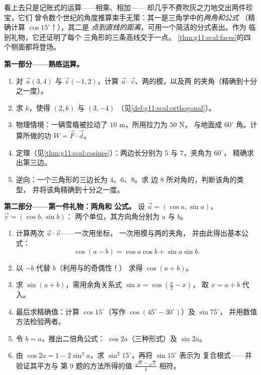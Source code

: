 \begin{problem}
\label{pb:g11:scal:1}
看上去只是记账式的运算——相乘、相加——
却几乎不费吹灰之力地交出两件珍宝，它们
曾令数个世纪的角度推算束手无策：其一是三角学中的\emph{两角和公式}
（精确计算 $\cos 15^\circ$！），其二是
\emph{点到直线的距离}，可用一个简洁的分式表出。作为
临别礼物，它还证明了每个
三角形的三条高线交于一点。
\cref{thm:g11:scal:faces}的四个侧面都将登场。

\medskip
\noindent\textbf{第一部分——熟练运算。}
\begin{enumerate}
  \item 对 $\vec u(3, 4)$ 与 $\vec v(-1, 2)$，计算
        $\vec u \cdot \vec v$、两的模，以及两
        的夹角（精确到十分之一度）。
  \item 求 $k$，使得 $(2, k)$ 与 $(3, -4)$ 
        （见\cref{def:g11:scal:orthogonal}）。
  \item 物理情境：一辆雪橇被拉动了 $10$ m，所用拉力为 $50$ N，
        与地面成 $60^\circ$ 角。计算所做的功
        $W = \vec F \cdot \vec d$。
  \item {}定理（见\cref{thm:g11:scal:cosines}）：两边长分别为
        $5$ 与 $7$，夹角为 $60^\circ$，
        精确求出第三边。
  \item 逆向：一个三角形的三边长为 $4$、$6$、$8$。求
        边 $8$ 所对角的，判断该角的类型，
        并将该角精确到十分之一度。
\end{enumerate}

\medskip
\noindent\textbf{第二部分——第一件礼物：两角和
公式。}
设 $\vec u = (\cos a, \sin a)$，$\vec v = (\cos b, \sin b)$：
两个单位，其方向角分别为 $a$ 与 $b$。
\begin{enumerate}[resume]
  \item 计算两次 $\vec u \cdot \vec v$——一次用坐标，
        一次用模与两的夹角，
        并由此得出基本公式：
        \[
        \cos(a - b) = \cos a \cos b + \sin a \sin b .
        \]
  \item 以 $-b$ 代替 $b$（利用与的奇偶性！）
        求得 $\cos(a + b)$。
  \item 求 $\sin(a + b)$，需用余角关系式
        $\sin x = \cos\left(\frac\pi2 - x\right)$，
        取 $x = a + b$ 代入。
  \item 最后求精确值：计算 $\cos 15^\circ$（写作
        $\cos(45^\circ - 30^\circ)$）及 $\sin 75^\circ$，
        并用数值方法检验两者。
  \item 令 $b = a$，推出二倍角公式：
        $\cos 2a$（三种形式）及 $\sin 2a$。
  \item 由 $\cos 2a = 1 - 2\sin^2 a$，求
        $\sin^2 15^\circ$，再将 $\sin 15^\circ$ 表示为
        复合根式——并验证其平方与
        第 9 题的方法所得的值 $\frac{\sqrt6 - \sqrt2}{4}$
        相符。
\end{enumerate}


\end{problem}
